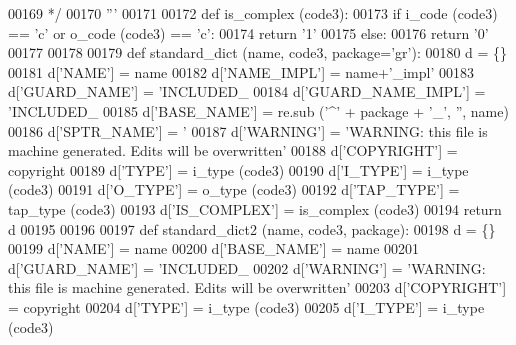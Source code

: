 \begin{DoxyCode}
{{{{{{{{00169 \textcolor{stringliteral}{ */}
00170 \textcolor{stringliteral}{'''}
00171 
00172 \textcolor{keyword}{def }is_complex (code3):
00173     \textcolor{keywordflow}{if} i\_code (code3) == \textcolor{stringliteral}{'c'} \textcolor{keywordflow}{or} o\_code (code3) == \textcolor{stringliteral}{'c'}:
00174         \textcolor{keywordflow}{return} \textcolor{stringliteral}{'1'}
00175     \textcolor{keywordflow}{else}:
00176         \textcolor{keywordflow}{return} \textcolor{stringliteral}{'0'}
00177 
00178 
00179 \textcolor{keyword}{def }standard_dict (name, code3, package='gr'):
00180     d = \{\}
00181     d[\textcolor{stringliteral}{'NAME'}] = name
00182     d[\textcolor{stringliteral}{'NAME\_IMPL'}] = name+\textcolor{stringliteral}{'\_impl'}
00183     d[\textcolor{stringliteral}{'GUARD\_NAME'}] = \textcolor{stringliteral}{'INCLUDED\_%
00184     d[\textcolor{stringliteral}{'GUARD\_NAME\_IMPL'}] = \textcolor{stringliteral}{'INCLUDED\_%
00185     d[\textcolor{stringliteral}{'BASE\_NAME'}] = re.sub (\textcolor{stringliteral}{'^'} + package + \textcolor{stringliteral}{'\_'}, \textcolor{stringliteral}{''}, name)
00186     d[\textcolor{stringliteral}{'SPTR\_NAME'}] = \textcolor{stringliteral}{'%
00187     d[\textcolor{stringliteral}{'WARNING'}] = \textcolor{stringliteral}{'WARNING: this file is machine generated. Edits will be overwritten'}
00188     d[\textcolor{stringliteral}{'COPYRIGHT'}] = copyright
00189     d[\textcolor{stringliteral}{'TYPE'}] = i\_type (code3)
00190     d[\textcolor{stringliteral}{'I\_TYPE'}] = i\_type (code3)
00191     d[\textcolor{stringliteral}{'O\_TYPE'}] = o\_type (code3)
00192     d[\textcolor{stringliteral}{'TAP\_TYPE'}] = tap\_type (code3)
00193     d[\textcolor{stringliteral}{'IS\_COMPLEX'}] = is\_complex (code3)
00194     \textcolor{keywordflow}{return} d
00195 
00196 
00197 \textcolor{keyword}{def }standard_dict2 (name, code3, package):
00198     d = \{\}
00199     d[\textcolor{stringliteral}{'NAME'}] = name
00200     d[\textcolor{stringliteral}{'BASE\_NAME'}] = name
00201     d[\textcolor{stringliteral}{'GUARD\_NAME'}] = \textcolor{stringliteral}{'INCLUDED\_%
00202     d[\textcolor{stringliteral}{'WARNING'}] = \textcolor{stringliteral}{'WARNING: this file is machine generated. Edits will be overwritten'}
00203     d[\textcolor{stringliteral}{'COPYRIGHT'}] = copyright
00204     d[\textcolor{stringliteral}{'TYPE'}] = i\_type (code3)
00205     d[\textcolor{stringliteral}{'I\_TYPE'}] = i\_type (code3)
}}}}}}}}}}}}
\end{DoxyCode}
